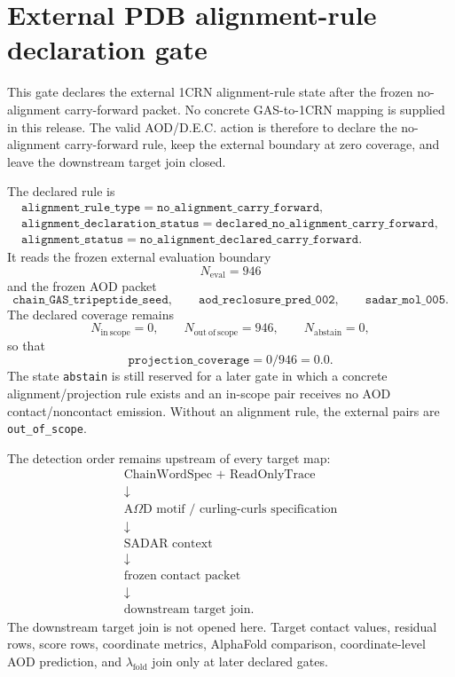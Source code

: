 \section{External PDB alignment-rule declaration gate}
\label{sec:external-pdb-alignment-rule-declaration-gate}

This gate declares the external 1CRN alignment-rule state after the frozen
no-alignment carry-forward packet.  No concrete GAS-to-1CRN mapping is supplied
in this release.  The valid AOD/D.E.C. action is therefore to declare the
no-alignment carry-forward rule, keep the external boundary at zero coverage,
and leave the downstream target join closed.

The declared rule is
\[
\begin{gathered}
\texttt{alignment\_rule\_type}=\texttt{no\_alignment\_carry\_forward},\\
\texttt{alignment\_declaration\_status}=\texttt{declared\_no\_alignment\_carry\_forward},\\
\texttt{alignment\_status}=\texttt{no\_alignment\_declared\_carry\_forward}.
\end{gathered}
\]
It reads the frozen external evaluation boundary
\[
N_{\mathrm{eval}}=946
\]
and the frozen AOD packet
\[
\texttt{chain\_GAS\_tripeptide\_seed},\qquad
\texttt{aod\_reclosure\_pred\_002},\qquad
\texttt{sadar\_mol\_005}.
\]
The declared coverage remains
\[
N_{\mathrm{in\ scope}}=0,\qquad
N_{\mathrm{out\ of\ scope}}=946,\qquad
N_{\mathrm{abstain}}=0,
\]
so that
\[
\texttt{projection\_coverage}=0/946=0.0.
\]
The state \texttt{abstain} is still reserved for a later gate in which a
concrete alignment/projection rule exists and an in-scope pair receives no AOD
contact/noncontact emission.  Without an alignment rule, the external pairs are
\texttt{out\_of\_scope}.

The detection order remains upstream of every target map:
\[
\begin{array}{c}
\text{ChainWordSpec + ReadOnlyTrace}\\
\downarrow\\
\text{A$\Omega$D motif / curling-curls specification}\\
\downarrow\\
\text{SADAR context}\\
\downarrow\\
\text{frozen contact packet}\\
\downarrow\\
\text{downstream target join.}
\end{array}
\]
The downstream target join is not opened here.  Target contact values, residual
rows, score rows, coordinate metrics, AlphaFold comparison, coordinate-level AOD
prediction, and \(\lambda_{\mathrm{fold}}\) join only at later declared gates.

